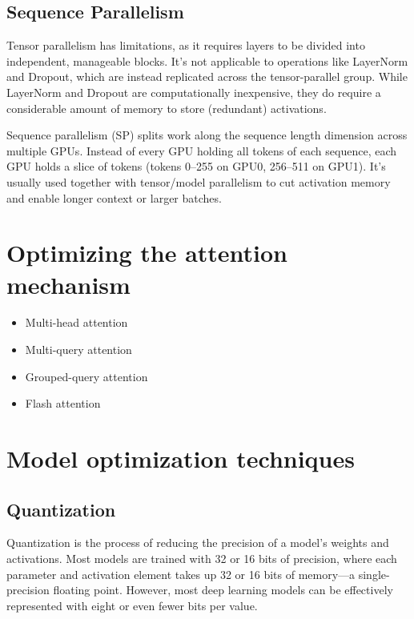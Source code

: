 \subsection{Sequence Parallelism}

Tensor parallelism has limitations, as it requires layers to be divided into independent, manageable blocks. It's not applicable to operations like LayerNorm and Dropout, which are instead replicated across the tensor-parallel group. While LayerNorm and Dropout are computationally inexpensive, they do require a considerable amount of memory to store (redundant) activations.

Sequence parallelism (SP) splits work along the sequence length dimension across multiple GPUs. Instead of every GPU holding all tokens of each sequence, each GPU holds a slice of tokens (\eg tokens 0–255 on GPU0, 256–511 on GPU1). It's usually used together with tensor/model parallelism to cut activation memory and enable longer context or larger batches.



\section{Optimizing the attention mechanism}

\begin{itemize}
	\item Multi-head attention
	\item Multi-query attention
	\item Grouped-query attention
	\item Flash attention
\end{itemize}



\section{Model optimization techniques}

\subsection{Quantization}

Quantization is the process of reducing the precision of a model's weights and activations. Most models are trained with 32 or 16 bits of precision, where each parameter and activation element takes up 32 or 16 bits of memory—a single-precision floating point. However, most deep learning models can be effectively represented with eight or even fewer bits per value.  

